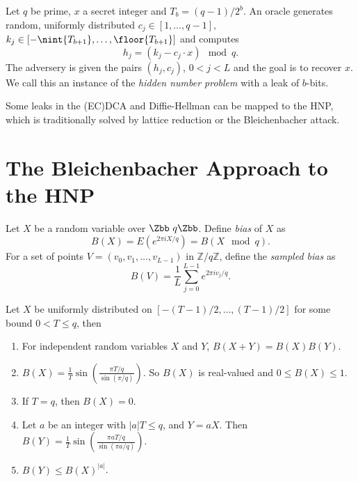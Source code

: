 \begin{definition}
Let $q$ be prime, $x$ a secret integer and $T_b = (q-1)/2^b$. An oracle generates random, uniformly distributed $c_j \in [1,\ldots, q-1],$ $k_j \in [-\nint{T_{b+1}}, \ldots, \floor{T_{b+1}}]$ and computes 
\begin{equation}\label{eqHNP}
    h_j = (k_j - c_j \cdot x) \mod q.
\end{equation}
The adversery is given the pairs $(h_j, c_j)$, $0<j<L$ and the goal is to recover $x$. We call this an instance of the \textit{hidden number problem} with a leak of $b$-bits.
\end{definition}

Some leaks in the (EC)DCA and Diffie-Hellman can be mapped to the HNP, which is traditionally solved by lattice reduction or the Bleichenbacher attack.
\section{The Bleichenbacher Approach to the HNP}
\begin{definition}
    Let $X$ be a random variable over $\Zbb \ q \Zbb$. Define \textit{bias} of $X$ as 
    \begin{equation}
        B(X) = E(e^{2\pi i X / q}) = B(X \mod q).
        \tag{5}
        \end{equation}
        For a set of points $V = (v_0, v_1, \dots, v_{L-1})$ in $\mathbb{Z}/q\mathbb{Z}$, define the \textit{sampled bias} as
        \begin{equation}
        B(V) = \frac{1}{L} \sum_{j=0}^{L-1} e^{2\pi i v_j / q}.
        \tag{6}
    \end{equation}

    \begin{lemma}
        Let $X$ be uniformly distributed on $[-(T-1)/2, \ldots, (T-1)/2]$ for some bound $0 < T \leq q$, then
        \begin{enumerate}[label=\arabic*.]
            \item For independent random variables \(X\) and \(Y\), \(B(X + Y) = B(X)B(Y)\).
            \item \(B(X) = \frac{1}{T} \sin\left(\frac{\pi T / q}{\sin(\pi / q)}\right)\). So \(B(X)\) is real-valued and \(0 \leq B(X) \leq 1\).
            \item If $T = q$, then \(B(X) = 0\).
            \item Let \(a\) be an integer with \(|a|T \leq q\), and \(Y = aX\). Then \(B(Y) = \frac{1}{T} \sin\left(\frac{\pi a T / q}{\sin(\pi a / q)}\right)\).
            \item \(B(Y) \leq B(X)^{|a|}\).
        \end{enumerate} 
    \end{lemma}
\end{definition}

